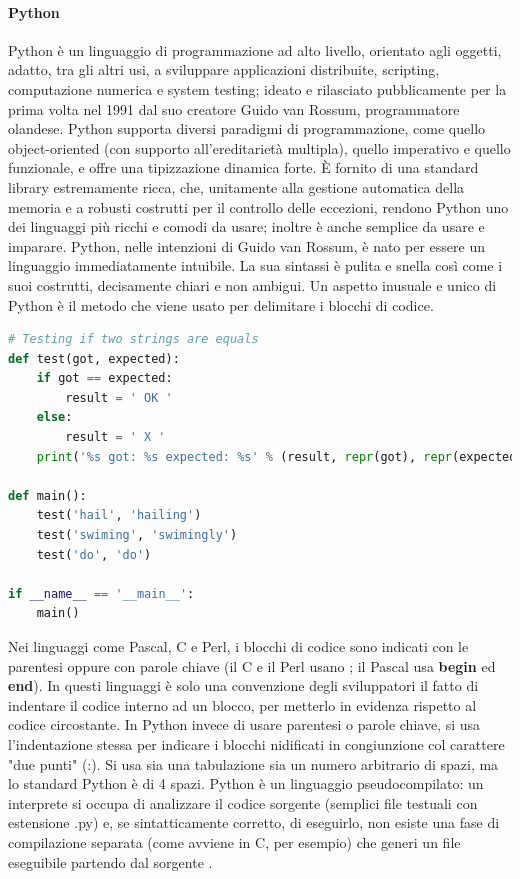 \paragraph{Python}
Python è un linguaggio di programmazione ad alto livello, orientato agli oggetti, adatto, tra gli altri usi, a sviluppare applicazioni 
distribuite, scripting, computazione numerica e system testing; ideato e rilasciato pubblicamente per la prima volta nel 1991 dal suo 
creatore Guido van Rossum, programmatore olandese.\hfill\break
Python supporta diversi paradigmi di programmazione, come quello object-oriented (con supporto all'ereditarietà multipla), quello 
imperativo e quello funzionale, e offre una tipizzazione dinamica forte. È fornito di una standard library estremamente ricca, che, 
unitamente alla gestione automatica della memoria e a robusti costrutti per il controllo delle eccezioni, rendono Python uno dei linguaggi 
più ricchi e comodi da usare; inoltre è anche semplice da usare e imparare. 
Python, nelle intenzioni di Guido van Rossum, è nato per essere un linguaggio immediatamente intuibile. La sua sintassi è pulita e snella 
così come i suoi costrutti, decisamente chiari e non ambigui.\hfill\break
Un aspetto inusuale e unico di Python è il metodo che viene usato per delimitare i blocchi di codice.
%
\lstset{style=python_code_style}
\begin{lstlisting}[language=Python, caption={Esempio di programma scritto in Python}]
# Testing if two strings are equals
def test(got, expected):
    if got == expected:
        result = ' OK '
    else:
        result = ' X '
    print('%s got: %s expected: %s' % (result, repr(got), repr(expected)))

def main():
    test('hail', 'hailing')
    test('swiming', 'swimingly')
    test('do', 'do')

if __name__ == '__main__':
    main()
\end{lstlisting}
%
Nei linguaggi come Pascal, C e Perl, i blocchi di codice sono indicati con le parentesi oppure con parole chiave 
(il C e il Perl usano \textbf{{ }}; il Pascal usa \textbf{begin} ed \textbf{end}). In questi linguaggi è solo una convenzione degli sviluppatori il fatto di 
indentare il codice interno ad un blocco, per metterlo in evidenza rispetto al codice circostante. In Python invece di usare parentesi 
o parole chiave, si usa l'indentazione stessa per indicare i blocchi nidificati in congiunzione col carattere "due punti" (:). Si usa 
sia una tabulazione sia un numero arbitrario di spazi, ma lo standard Python è di 4 spazi.
Python è un linguaggio pseudocompilato: un interprete si occupa di analizzare il codice sorgente (semplici file testuali con 
estensione .py) e, se sintatticamente corretto, di eseguirlo, non esiste una fase di compilazione separata (come 
avviene in C, per esempio) che generi un file eseguibile partendo dal sorgente \cite{python-documentation}.
%
